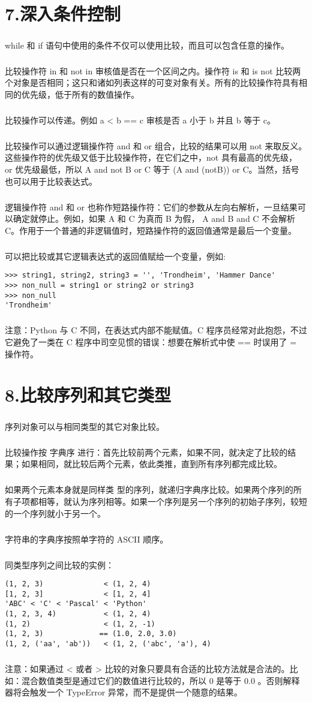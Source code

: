 \documentclass{article}
\begin{document}
\begin{CJK}{UTF8}{gbsn}
\section*{7.深入条件控制}
\subparagraph*{}
while 和 if 语句中使用的条件不仅可以使用比较，而且可以包含任意的操作。
\subparagraph*{}
比较操作符 in 和 not in 审核值是否在一个区间之内。操作符 is 和 is not 比较两个对象是否相同；这只和诸如列表这样的可变对象有关。所有的比较操作符具有相同的优先级，低于所有的数值操作。
\subparagraph*{}
比较操作可以传递。例如 a < b == c 审核是否 a 小于 b 并且 b 等于 c。
\subparagraph*{}
比较操作可以通过逻辑操作符 and 和 or 组合，比较的结果可以用 not 来取反义。这些操作符的优先级又低于比较操作符，在它们之中，not 具有最高的优先级， or 优先级最低，所以 A and not B or C 等于 (A and (notB)) or C。当然，括号也可以用于比较表达式。
\subparagraph*{}
逻辑操作符 and 和 or 也称作短路操作符：它们的参数从左向右解析，一旦结果可以确定就停止。例如，如果 A 和 C 为真而 B 为假， A and B and C 不会解析 C。作用于一个普通的非逻辑值时，短路操作符的返回值通常是最后一个变量。
\subparagraph*{}
可以把比较或其它逻辑表达式的返回值赋给一个变量，例如:
\begin{verbatim}
>>> string1, string2, string3 = '', 'Trondheim', 'Hammer Dance'
>>> non_null = string1 or string2 or string3
>>> non_null
'Trondheim'
\end{verbatim}
\subparagraph*{}
注意：Python 与 C 不同，在表达式内部不能赋值。C 程序员经常对此抱怨，不过它避免了一类在 C 程序中司空见惯的错误：想要在解析式中使 == 时误用了 = 操作符。
\section*{8.比较序列和其它类型}
\subparagraph*{}
序列对象可以与相同类型的其它对象比较。
\subparagraph*{}
比较操作按 字典序 进行：首先比较前两个元素，如果不同，就决定了比较的结果；如果相同，就比较后两个元素，依此类推，直到所有序列都完成比较。
\subparagraph*{}
如果两个元素本身就是同样类 型的序列，就递归字典序比较。如果两个序列的所有子项都相等，就认为序列相等。如果一个序列是另一个序列的初始子序列，较短的一个序列就小于另一个。
\subparagraph*{}
字符串的字典序按照单字符的 ASCII 顺序。
\subparagraph*{}
同类型序列之间比较的实例：
\begin{verbatim}
(1, 2, 3)              < (1, 2, 4)
[1, 2, 3]              < [1, 2, 4]
'ABC' < 'C' < 'Pascal' < 'Python'
(1, 2, 3, 4)           < (1, 2, 4)
(1, 2)                 < (1, 2, -1)
(1, 2, 3)             == (1.0, 2.0, 3.0)
(1, 2, ('aa', 'ab'))   < (1, 2, ('abc', 'a'), 4)
\end{verbatim}
\subparagraph*{}
注意：如果通过 < 或者 > 比较的对象只要具有合适的比较方法就是合法的。比如：混合数值类型是通过它们的数值进行比较的，所以 0 是等于 0.0 。否则解释器将会触发一个 TypeError 异常，而不是提供一个随意的结果。

\end{CJK}
\end{document}
